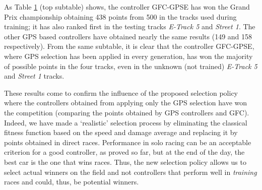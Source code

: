 \documentclass[10pt,journal,compsoc]{IEEEtran}
\begin{document}
\begin{table}[h!]
{{\begin{tabular}{c}
%			
%
%
%				
%				
			\end{tabular}
		}\label{tab:GPS_and_Varyingalpha_RSresults}
	}
\end{table}
\raggedbottom
As Table \ref{tab:GPS_and_Varyingalpha_RSresults} (top subtable)
shows, the controller {\sf GFC-GPSE} has won the Grand Prix
championship obtaining 438 points from 500 in the tracks used during
training; it has also ranked first in the testing tracks
\textit{E-Track 5} and \textit{Street 1}.
The other GPS based controllers have obtained nearly the same results (149 and 158 respectively).
From the same subtable, it is clear that the controller {\sf GFC-GPSE}, where GPS selection has been applied in every generation, has won the majority of possible points in the four tracks, even in the unknown (not trained) \textit{E-Track 5}  and \textit{Street 1} tracks.

These results come to confirm the influence of the proposed selection policy where the controllers obtained from applying only the GPS selection have won the competition (comparing the points obtained by GPS controllers and GFC).
Indeed, we have made a `realistic' selection process by eliminating
the classical fitness function based on the speed and damage average
and replacing it by points obtained in direct races. 
Performance in solo racing can be an acceptable criterion for a good
controller, as proved so far, but at the end of the day, the best car
is the one that wins races. Thus, the new selection policy allows us
to select actual winners on the field and not controllers that perform
well in {\em training} races and could, thus, be potential winners.
\end{document}
